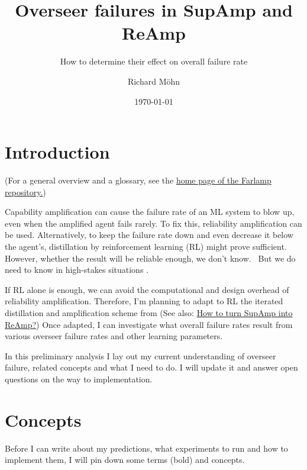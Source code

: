 \documentclass{farlamp}
\title{Overseer failures in SupAmp and ReAmp}
\subtitle{How to determine their effect on overall failure rate}
\author{Richard Möhn}
\date{\today}
\begin{document}
\maketitle
\tableofcontents

\section{Introduction}

(For a general overview and a glossary, see the
\href{https://github.com/rmoehn/farlamp}{home page of the Farlamp
repository.})

Capability amplification can cause the failure rate of an ML system to blow up,
even when the amplified agent fails rarely. To fix this, reliability
amplification can be used. Alternatively, to keep the failure rate down and even
decrease it below the agent's, distillation by reinforcement learning (RL) might
prove sufficient. However, whether the result will be reliable enough, we don't
know.~\parencite{ChriRelAmp} But we do need to know in high-stakes situations
\parencite[see][]{ChriLearnCata}.

If RL alone is enough, we can avoid the computational and design overhead of
reliability amplification. Therefore, I'm planning to adapt to RL the iterated
distillation and amplification scheme from \textcite{CSASupAmp} (See also:
\href{https://github.com/rmoehn/farlamp/raw/master/supamp-reamp.pdf}{How to turn
SupAmp into ReAmp?}) Once adapted, I can investigate what overall failure rates
result from various overseer failure rates and other learning parameters.

In this preliminary analysis I lay out my current understanding of overseer
failure, related concepts and what I need to do. I will update it and answer
open questions on the way to implementation.


\section{Concepts}

Before I can write about my predictions, what experiments to run and how to
implement them, I will pin down some terms (bold) and concepts.


\end{document}
